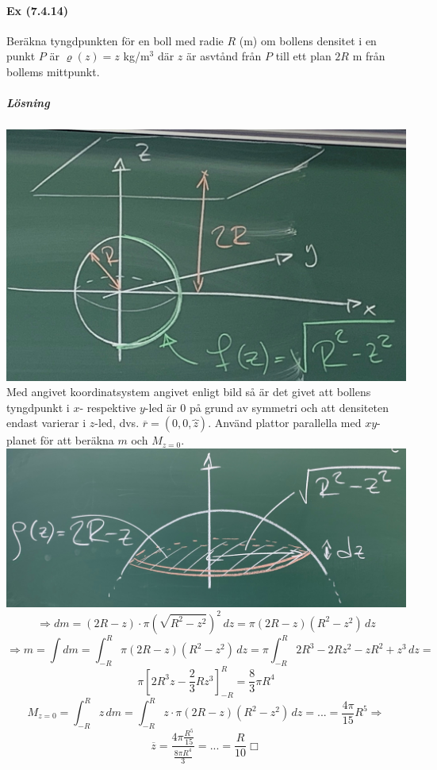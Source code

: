\paragraph*{Ex (7.4.14)} Beräkna tyngdpunkten för en boll med radie $R$ (m) om bollens densitet i en punkt $P$ är $\varrho(z)=z$ kg/m$^3$ där $z$ är asvtånd från $P$ till ett plan $2R$ m från bollems mittpunkt.
\subparagraph{Lösning}
\includegraphics[scale=0.1]{lessons/lesson20/imgs/img04.jpg}\\
Med angivet koordinatsystem angivet enligt bild så är det givet att bollens tyngdpunkt i $x$- respektive $y$-led är $0$ på grund av symmetri och att densiteten endast varierar i $z$-led, dvs. $\overline{r}=(0,0,\overbrace{z})$.
Använd plattor parallella med  $xy$-planet för att beräkna $m$ och $M_{z=0}$.\\
\includegraphics[scale=0.1]{lessons/lesson20/imgs/img05.jpg}
\begin{equation*}
    \Rightarrow dm=
    (2R-z)\cdot\pi(\sqrt{R^2-z^2})^2\, dz=
    \pi(2R-z)(R^2-z^2)\, dz
\end{equation*}
\begin{equation*}
    \Rightarrow m=
    \int dm=
    \int_{-R}^R\pi(2R-z)(R^2-z^2)\, dz=
    \pi\int_{-R}^R 2R^3-2Rz^2-zR^2+z^3\, dz=
\end{equation*}
\begin{equation*}
    \pi[2R^3z-\frac{2}{3}Rz^3]_{-R}^R=
    \frac{8}{3}\pi R^4
\end{equation*}
\begin{equation*}
    M_{z=0}=\int_{-R}^R z\, dm=
    \int_{-R}^R z\cdot\pi(2R-z)(R^2-z^2)\, dz=
    ...=
    \frac{4\pi}{15}R^5\Rightarrow
\end{equation*}
\begin{equation*}
    \overline{z}=\frac{4\pi\frac{R^5}{15}}{\frac{8\pi R^4}{3}}=
    ...=
    \frac{R}{10}\Box
\end{equation*}

